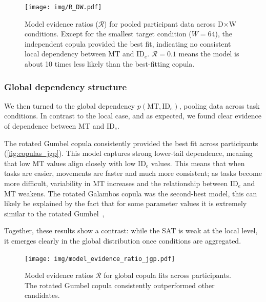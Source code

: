 \documentclass[acmlarge, manuscript,review]{acmart}
\newcommand{\mt}{\ensuremath{{\text{MT}}}\xspace}
\newcommand{\ide}{\ensuremath{{\text{ID}_e}}\xspace}
\begin{document}

\begin{figure}[htbp]
	\centering
	\texttt{[image: img/R\_DW.pdf]}
	\caption{Model evidence ratios ($\mathcal{R}$) for pooled participant data across D$\times$W conditions. Except for the smallest target condition ($W=64$), the independent copula provided the best fit, indicating no consistent local dependency between MT and \ide. $\mathcal{R}=0.1$ means the model is about 10 times less likely than the best-fitting copula.}
	\label{fig:copula_fit_jgp_dw}
\end{figure}


\subsubsection{Global dependency structure}
We then turned to the global dependency $p(\mt, \ide)$, pooling data across task conditions. In contrast to the local case, and as expected, we found clear evidence of dependence between MT and \ide. 

The rotated Gumbel copula consistently provided the best fit across participants (\autoref{fig:copulas_jgp}). This model captures strong lower-tail dependence, meaning that low MT values align closely with low \ide values. This means that when tasks are easier, movements are faster and much more consistent; as tasks become more difficult, variability in MT increases and the relationship between \ide and MT weakens. The rotated Galambos copula was the second-best model, this can likely be explained by the fact that for some parameter values it is extremely similar to the rotated Gumbel~\cite{genest2017},

Together, these results show a contrast: while the SAT is weak at the local level, it emerges clearly in the global distribution once conditions are aggregated.

\begin{figure}[htbp]
	\centering
	\texttt{[image: img/model\_evidence\_ratio\_jgp.pdf]}
	\caption{Model evidence ratios $\mathcal{R}$ for global copula fits across participants. The rotated Gumbel copula consistently outperformed other candidates.}
	\label{fig:copulas_jgp}
\end{figure}
\end{document}
